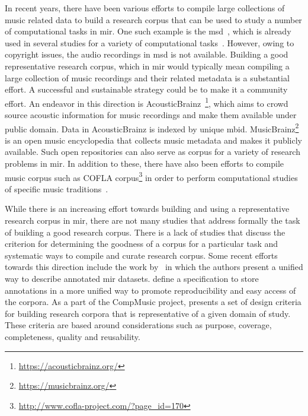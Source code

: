 In recent years, there have been various efforts to compile large collections of music related data to build a research corpus that can be used to study a number of computational tasks in \gls{mir}. One such example is the \gls{msd}~\citep{Bertin-Mahieux2011}, which is already used in several studies for a variety of computational tasks~\citep{serra2012measuring,sturm2012survey}. However, owing to copyright issues, the audio recordings in \gls{msd} is not available. Building a good representative research corpus, which in \gls{mir} would typically mean compiling a large collection of music recordings and their related metadata is a substantial effort. A successful and sustainable strategy could be to make it a community effort. An endeavor in this direction is AcousticBrainz~\citep{porter2015acousticbrainz}\footnote{\url{https://acousticbrainz.org/}}, which aims to crowd source acoustic information for music recordings and make them available under public domain. Data in AcousticBrainz is indexed by unique \gls{mbid}. MusicBrainz\footnote{\url{https://musicbrainz.org/}} is an open music encyclopedia that collects music metadata and makes it publicly available. Such open repositories can also serve as corpus for a variety of research problems in \gls{mir}. In addition to these, there have also been efforts to compile music corpus such as COFLA corpus\footnote{\url{http://www.cofla-project.com/?page_id=170}} in order to perform computational studies of specific music traditions~\citep{kroher2016corpus}.

While there is an increasing effort towards building and using a representative research corpus in \gls{mir}, there are not many studies that address formally the task of building a good research corpus. There is a lack of studies that discuss the criterion for determining the goodness of a corpus for a particular task and systematic ways to compile and curate research corpus. Some recent efforts towards this direction include the work by~\cite{peeters2012towards} in which the authors present a unified way to describe annotated \Gls{mir} datasets. \cite{Humphrey:JAMS:ISMIR:14} define a specification to store annotations in a more unified way to promote reproducibility and easy access of the corpora. As a part of the CompMusic project, \cite{serra:14:corpus} presents a set of design criteria for building research corpora that is representative of a given domain of study. These criteria are based around considerations such as purpose, coverage, completeness, quality and reusability.

